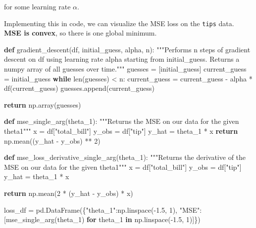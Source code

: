 \documentclass[
  letterpaper,
  DIV=11,
  numbers=noendperiod]{scrreprt}
\newenvironment{Shaded}{\begin{snugshade}}{\end{snugshade}}
\newcommand{\BuiltInTok}[1]{\textcolor[rgb]{0.00,0.23,0.31}{#1}}
\newcommand{\CommentTok}[1]{\textcolor[rgb]{0.37,0.37,0.37}{#1}}
\newcommand{\ControlFlowTok}[1]{\textcolor[rgb]{0.00,0.23,0.31}{\textbf{#1}}}
\newcommand{\DecValTok}[1]{\textcolor[rgb]{0.68,0.00,0.00}{#1}}
\newcommand{\FloatTok}[1]{\textcolor[rgb]{0.68,0.00,0.00}{#1}}
\newcommand{\KeywordTok}[1]{\textcolor[rgb]{0.00,0.23,0.31}{\textbf{#1}}}
\newcommand{\NormalTok}[1]{\textcolor[rgb]{0.00,0.23,0.31}{#1}}
\newcommand{\OperatorTok}[1]{\textcolor[rgb]{0.37,0.37,0.37}{#1}}
\newcommand{\StringTok}[1]{\textcolor[rgb]{0.13,0.47,0.30}{#1}}
\begin{document}
for some learning rate \(\alpha\).

Implementing this in code, we can visualize the MSE loss on the
\texttt{tips} data. \textbf{MSE is convex}, so there is one global
minimum.

\begin{Shaded}
\begin{Highlighting}[]
\KeywordTok{def}\NormalTok{ gradient\_descent(df, initial\_guess, alpha, n):}
    \CommentTok{"""Performs n steps of gradient descent on df using learning rate alpha starting}
\CommentTok{       from initial\_guess. Returns a numpy array of all guesses over time."""}
\NormalTok{    guesses }\OperatorTok{=}\NormalTok{ [initial\_guess]}
\NormalTok{    current\_guess }\OperatorTok{=}\NormalTok{ initial\_guess}
    \ControlFlowTok{while} \BuiltInTok{len}\NormalTok{(guesses) }\OperatorTok{\textless{}}\NormalTok{ n:}
\NormalTok{        current\_guess }\OperatorTok{=}\NormalTok{ current\_guess }\OperatorTok{{-}}\NormalTok{ alpha }\OperatorTok{*}\NormalTok{ df(current\_guess)}
\NormalTok{        guesses.append(current\_guess)}
        
    \ControlFlowTok{return}\NormalTok{ np.array(guesses)}

\KeywordTok{def}\NormalTok{ mse\_single\_arg(theta\_1):}
    \CommentTok{"""Returns the MSE on our data for the given theta1"""}
\NormalTok{    x }\OperatorTok{=}\NormalTok{ df[}\StringTok{"total\_bill"}\NormalTok{]}
\NormalTok{    y\_obs }\OperatorTok{=}\NormalTok{ df[}\StringTok{"tip"}\NormalTok{]}
\NormalTok{    y\_hat }\OperatorTok{=}\NormalTok{ theta\_1 }\OperatorTok{*}\NormalTok{ x}
    \ControlFlowTok{return}\NormalTok{ np.mean((y\_hat }\OperatorTok{{-}}\NormalTok{ y\_obs) }\OperatorTok{**} \DecValTok{2}\NormalTok{)}

\KeywordTok{def}\NormalTok{ mse\_loss\_derivative\_single\_arg(theta\_1):}
    \CommentTok{"""Returns the derivative of the MSE on our data for the given theta1"""}
\NormalTok{    x }\OperatorTok{=}\NormalTok{ df[}\StringTok{"total\_bill"}\NormalTok{]}
\NormalTok{    y\_obs }\OperatorTok{=}\NormalTok{ df[}\StringTok{"tip"}\NormalTok{]}
\NormalTok{    y\_hat }\OperatorTok{=}\NormalTok{ theta\_1 }\OperatorTok{*}\NormalTok{ x}
    
    \ControlFlowTok{return}\NormalTok{ np.mean(}\DecValTok{2} \OperatorTok{*}\NormalTok{ (y\_hat }\OperatorTok{{-}}\NormalTok{ y\_obs) }\OperatorTok{*}\NormalTok{ x)}

\NormalTok{loss\_df }\OperatorTok{=}\NormalTok{ pd.DataFrame(\{}\StringTok{"theta\_1"}\NormalTok{:np.linspace(}\OperatorTok{{-}}\FloatTok{1.5}\NormalTok{, }\DecValTok{1}\NormalTok{), }\StringTok{"MSE"}\NormalTok{:[mse\_single\_arg(theta\_1) }\ControlFlowTok{for}\NormalTok{ theta\_1 }\KeywordTok{in}\NormalTok{ np.linspace(}\OperatorTok{{-}}\FloatTok{1.5}\NormalTok{, }\DecValTok{1}\NormalTok{)]\})}


\end{Highlighting}
\end{Shaded}
\end{document}
